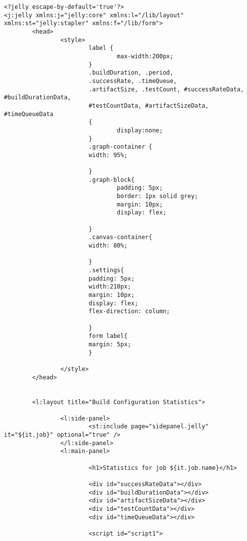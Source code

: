 \begin{lstlisting}
<?jelly escape-by-default='true'?>
<j:jelly xmlns:j="jelly:core" xmlns:l="/lib/layout" xmlns:st="jelly:stapler" xmlns:f="/lib/form">
        <head>
                <style>
                        label {
                                max-width:200px;
                        }
                        .buildDuration, .period,
                        .successRate, .timeQueue,
                        .artifactSize, .testCount, #successRateData, #buildDurationData,
                        #testCountData, #artifactSizeData, #timeQueueData
                        {
                                display:none;
                        }
                        .graph-container {
                        width: 95%;

                        }
                        .graph-block{
                                padding: 5px;
                                border: 1px solid grey;
                                margin: 10px;
                                display: flex;

                        }
                        .canvas-container{
                        width: 80%;

                        }
                        .settings{
                        padding: 5px;
                        width:210px;
                        margin: 10px;
                        display: flex;
                        flex-direction: column;

                        }
                        form label{
                        margin: 5px;
                        }

                </style>
        </head>


        <l:layout title="Build Configuration Statistics">

                <l:side-panel>
                        <st:include page="sidepanel.jelly" it="${it.job}" optional="true" />
                </l:side-panel>
                <l:main-panel>

                        <h1>Statistics for job ${it.job.name}</h1>

                        <div id="successRateData"></div>
                        <div id="buildDurationData"></div>
                        <div id="artifactSizeData"></div>
                        <div id="testCountData"></div>
                        <div id="timeQueueData"></div>

                        <script id="script1">


\end{lstlisting}
